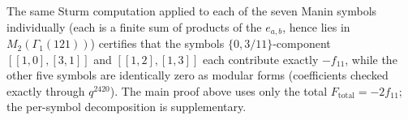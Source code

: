 \begin{remark}
The same Sturm computation applied to each of the seven Manin symbols
individually (each is a finite sum of products of the $e_{a,b}$, hence lies in
$M_2(\Gamma_1(121))$) certifies that the symbols $\{0,3/11\}$-component
$[[1,0],[3,1]]$ and $[[1,2],[1,3]]$ each contribute exactly $-f_{11}$, while
the other five symbols are identically zero as modular forms (coefficients
checked exactly through $q^{2420}$).  The main proof above uses only the total
$F_{\mathrm{total}}=-2f_{11}$; the per-symbol decomposition is supplementary.
\end{remark}
